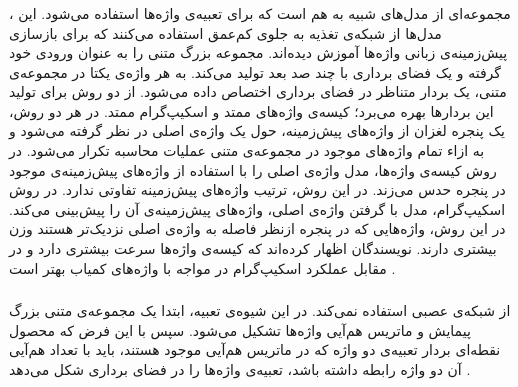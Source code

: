 \subsubsection{}
، مجموعه‌ای از مدل‌های شبیه به هم است که برای تعبیه‌ی واژه‌ها استفاده می‌شود. این مدل‌ها از شبکه‌ی تغذیه به جلوی کم‌عمق استفاده می‌کنند که برای بازسازی پیش‌زمینه‌ی زبانی واژه‌ها آموزش دیده‌اند.  مجموعه بزرگ متنی را به عنوان ورودی خود گرفته و یک فضای برداری با چند صد بعد تولید می‌کند. به هر واژه‌ی یکتا در مجموعه‌ی متنی، یک بردار متناظر در فضای برداری اختصاص داده می‌شود.  از دو روش برای تولید این بردارها بهره می‌برد؛ کیسه‌ی واژه‌های ممتد و اسکیپ‌گرام ممتد. در هر دو روش،‌ یک پنجره لغزان از واژه‌های پیش‌زمینه، حول یک واژه‌ی اصلی در نظر گرفته می‌شود و به ازاء تمام واژه‌های موجود در مجموعه‌ی متنی عملیات محاسبه تکرار می‌شود. در روش کیسه‌ی واژه‌ها، مدل واژه‌ی اصلی را با استفاده از واژه‌های پیش‌زمینه‌ی موجود در پنجره حدس می‌زند. در این روش، ترتیب واژه‌های پیش‌زمینه تفاوتی ندارد. در روش اسکیپ‌گرام، مدل با گرفتن واژه‌ی اصلی، واژه‌های پیش‌زمینه‌ی آن را پیش‌بینی می‌کند. در این روش، واژه‌هایی که در پنجره ازنظر فاصله به واژه‌ی اصلی نزدیک‌تر هستند وزن بیشتری دارند. نویسندگان  اظهار کرده‌اند که کیسه‌ی واژه‌ها سرعت بیشتری دارد و در مقابل عملکرد اسکیپ‌گرام در مواجه با واژه‌های کمیاب بهتر است \cite{word2vec}.
\subsubsection{}
از شبکه‌ی عصبی استفاده نمی‌کند. در این شیوه‌ی تعبیه، ابتدا یک مجموعه‌ی متنی بزرگ پیمایش و ماتریس هم‌آیی واژه‌ها تشکیل می‌شود. سپس با این فرض که محصول نقطه‌ای بردار تعبیه‌ی دو واژه که در ماتریس هم‌آیی موجود هستند،  باید با تعداد هم‌آیی آن دو واژه رابطه داشته باشد، تعبیه‌ی واژه‌ها را در فضای برداری شکل می‌دهد \cite{glove}.
